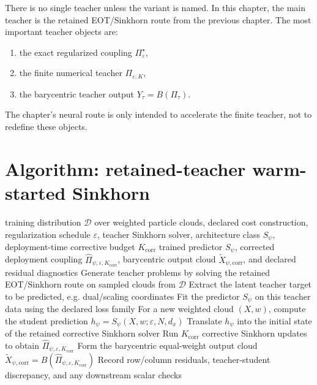 There is no single teacher unless the variant is named.  In this chapter, the
main teacher is the retained EOT/Sinkhorn route from the previous chapter.  The
most important teacher objects are:
\begin{enumerate}[label=(\roman*)]
  \item the exact regularized coupling \(\Pi_\varepsilon^\star\),
  \item the finite numerical teacher \(\Pi_{\varepsilon,K}\),
  \item the barycentric teacher output \(Y_\tau=B(\Pi_\tau)\).
\end{enumerate}
The chapter’s neural route is only intended to accelerate the finite teacher, not
to redefine these objects.

\section{Algorithm: retained-teacher warm-started Sinkhorn}
\label{sec:bf-learned-ot-teacher}

\begin{algorithm}[ht]
\caption{\texttt{train\_and\_deploy\_warmstarted\_sinkhorn}}
\begin{algorithmic}[1]
\Require training distribution \(\mathcal D\) over weighted particle clouds, declared cost construction, regularization schedule \(\varepsilon\), teacher Sinkhorn solver, architecture class \(S_\psi\), deployment-time corrective budget \(K_{\mathrm{corr}}\)
\Ensure trained predictor \(S_\psi\), corrected deployment coupling \(\widehat\Pi_{\psi,\varepsilon,K_{\mathrm{corr}}}\), barycentric output cloud \(\widetilde X_{\psi,\mathrm{corr}}\), and declared residual diagnostics
\State Generate teacher problems by solving the retained EOT/Sinkhorn route on sampled clouds from \(\mathcal D\)
\State Extract the latent teacher target to be predicted, e.g. dual/scaling coordinates
\State Fit the predictor \(S_\psi\) on this teacher data using the declared loss family
\State For a new weighted cloud \((X,w)\), compute the student prediction \(h_\psi=S_\psi(X,w;\varepsilon,N,d_x)\)
\State Translate \(h_\psi\) into the initial state of the retained corrective Sinkhorn solver
\State Run \(K_{\mathrm{corr}}\) corrective Sinkhorn updates to obtain \(\widehat\Pi_{\psi,\varepsilon,K_{\mathrm{corr}}}\)
\State Form the barycentric equal-weight output cloud \(\widetilde X_{\psi,\mathrm{corr}}=B(\widehat\Pi_{\psi,\varepsilon,K_{\mathrm{corr}}})\)
\State Record row/column residuals, teacher-student discrepancy, and any downstream scalar checks
\end{algorithmic}
\end{algorithm}

